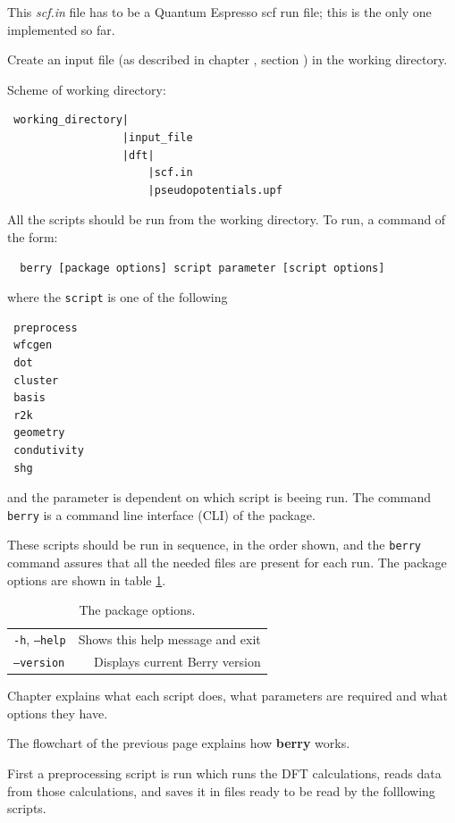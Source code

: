 \documentclass[a4paper,12pt]{report}
\begin{document}
 This \emph{scf.in} file has to be a {\sc Quantum Espresso} scf run file;
 this is the only one implemented so far.

 Create an input file (as described in chapter , section )
 in the working directory.

 \newpage
Scheme of working directory:
\begin{verbatim}
 working_directory|
                  |input_file
                  |dft|
                      |scf.in
                      |pseudopotentials.upf
\end{verbatim}
\bigskip

 All the scripts should be run from the working directory.
 To run, a command of the form:
 \begin{verbatim}
  berry [package options] script parameter [script options]
 \end{verbatim}
where the \texttt{script} is one of the following
\begin{verbatim}
 preprocess
 wfcgen
 dot
 cluster
 basis
 r2k
 geometry
 condutivity
 shg
\end{verbatim}
and the parameter is dependent on which script is beeing run.
The command \texttt{berry} is a command line interface (CLI) of the package.

These scripts should be run in sequence, in the order shown, and the \texttt{berry} command assures
that all the needed files are present for each run.
The package options are shown in table \ref{tab:package_options}.

\begin{table}[h]
 \centering
 \caption{The package options.}\label{tab:package_options}
\begin{tabular}[]{lr}
\hline
  \texttt{-h}, \texttt{--help}     &    Shows this help message and exit \\
  \texttt{--version}               &    Displays current Berry version \\
\hline
\end{tabular}
\bigskip
\end{table}

Chapter  explains what each script does,
what parameters are required and what options they have.



The flowchart of the previous page explains how \textbf{berry} works.

First a preprocessing script is run which runs the DFT calculations, reads data from those
calculations, and saves it in files ready to be read by the folllowing scripts.
\end{document}
